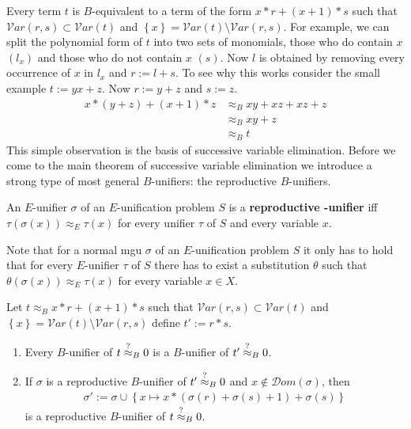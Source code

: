		Every term $t$ is $B$-equivalent to a term of the form $x*r+(x+1)*s$ such that $\mathcal{V}ar(r,s)\subset\mathcal{V}ar(t)$ and $\left\lbrace x\right\rbrace =\mathcal{V}ar(t)\setminus\mathcal{V}ar(r,s)$. For example, we can split the polynomial form of $t$ into two sets of monomials, those who do contain $x$  $\left(l_x\right)$ and those who do not contain $x$ $(s)$. Now $l$ is obtained by removing every occurrence of $x$ in $l_x$ and $r:=l+s$. To see why this works consider the small example $t:=yx+z$. Now $r:=y+z$ and $s:=z$.
		\begin{align*}
		x*(y+z)+(x+1)*z&\approx_B xy+xz+xz+z\\
		&\approx_B xy+z\\
		&\approx_B t
		\end{align*}
		This simple observation is the basis of successive variable elimination.
		Before we come to the main theorem of successive variable elimination we introduce a strong type of most general $B$-unifiers: the reproductive $B$-unifiers.
		\begin{definition}
		An $E$-unifier $\sigma$ of an $E$-unification problem $S$ is a \textbf{reproductive \mBold-unifier} iff $\tau(\sigma(x))\approx_E\tau(x)$ for every unifier $\tau$ of $S$ and every variable $x$.
		\end{definition}
		Note that for a normal mgu $\sigma$ of an $E$-unification problem $S$ it only has to hold that for every $E$-unifier $\tau$ of $S$ there has to exist a substitution $\theta$ such that $\theta(\sigma(x))\approx_E\tau(x)$ for every variable $x\in X$. 
		\begin{theorem}\label{sucVEli}
		Let $t\approx_B x*r+(x+1)*s$ such that $\mathcal{V}ar(r,s)\subset\mathcal{V}ar(t)$ and $\left\lbrace x\right\rbrace =\mathcal{V}ar(t)\setminus\mathcal{V}ar(r,s)$ define $t':=r*s$.
		\begin{enumerate}
		\item Every $B$-unifier of $t\stackrel{?}{\approx}_B0$ is a $B$-unifier of $t'\stackrel{?}{\approx}_B0$.
		\item If $\sigma$ is a reproductive $B$-unifier of $t'\stackrel{?}{\approx}_B0$ and $x\notin\mathcal{D}om(\sigma)$, then 
		\begin{align*}
		\sigma':=\sigma\cup\left\lbrace x\mapsto x*(\sigma(r)+\sigma(s)+1)+\sigma(s)\right\rbrace
		\end{align*}
		is a reproductive $B$-unifier of $t\stackrel{?}{\approx}_B0$.
		\end{enumerate}
		\end{theorem}
